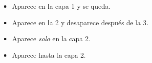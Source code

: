 \documentclass{beamer}
\begin{document}
\begin{frame}
\begin{itemize}
    \item<1-> Aparece en la capa 1 y se queda.
    \item<2-3> Aparece en la 2 y desaparece después de la 3.
    \item<2> Aparece \textit{solo} en la capa 2.
    \item<-2> Aparece hasta la capa 2.
\end{itemize}
\end{frame}
\end{document}
